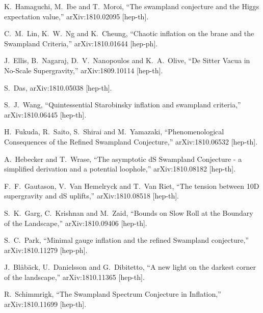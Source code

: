\documentclass[11pt,a4paper]{article}
\begin{document}
\begin{thebibliography}{99}
  K.~Hamaguchi, M.~Ibe and T.~Moroi,
  ``The swampland conjecture and the Higgs expectation value,''
  arXiv:1810.02095 [hep-th].

  C.~M.~Lin, K.~W.~Ng and K.~Cheung,
  ``Chaotic inflation on the brane and the Swampland Criteria,''
  arXiv:1810.01644 [hep-ph].

  J.~Ellis, B.~Nagaraj, D.~V.~Nanopoulos and K.~A.~Olive,
  ``De Sitter Vacua in No-Scale Supergravity,''
  arXiv:1809.10114 [hep-th].
  
  S.~Das,
  arXiv:1810.05038 [hep-th].
  
  S.~J.~Wang,
  ``Quintessential Starobinsky inflation and swampland criteria,''
  arXiv:1810.06445 [hep-th].
  
  H.~Fukuda, R.~Saito, S.~Shirai and M.~Yamazaki,
  ``Phenomenological Consequences of the Refined Swampland Conjecture,''
  arXiv:1810.06532 [hep-th].
  
  A.~Hebecker and T.~Wrase,
  ``The asymptotic dS Swampland Conjecture - a simplified derivation and a potential loophole,''
  arXiv:1810.08182 [hep-th].
  
  F.~F.~Gautason, V.~Van Hemelryck and T.~Van Riet,
  ``The tension between 10D supergravity and dS uplifts,''
  arXiv:1810.08518 [hep-th].
  

  
  S.~K.~Garg, C.~Krishnan and M.~Zaid,
  ``Bounds on Slow Roll at the Boundary of the Landscape,''
  arXiv:1810.09406 [hep-th].

  S.~C.~Park,
  ``Minimal gauge inflation and the refined Swampland conjecture,''
  arXiv:1810.11279 [hep-ph].
  
  J.~Blåbäck, U.~Danielsson and G.~Dibitetto,
  ``A new light on the darkest corner of the landscape,''
  arXiv:1810.11365 [hep-th].  
  
  R.~Schimmrigk,
  ``The Swampland Spectrum Conjecture in Inflation,''
  arXiv:1810.11699 [hep-th].
  

\end{thebibliography}
\end{document}
